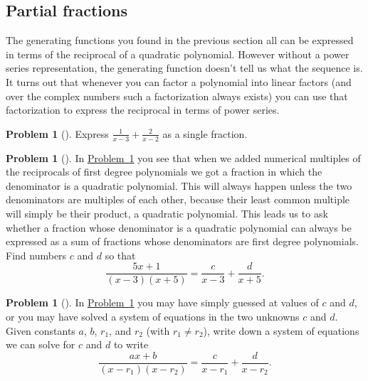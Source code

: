 \documentclass[10pt,]{book}
\theoremstyle{plain}
\theoremstyle{definition}
\newtheorem{activity}[project]{Problem}
\theoremstyle{definition}
\numberwithin{equation}{chapter}
\begin{document}
\subsection[{Partial fractions}]{Partial fractions}\label{subsection-49}
The generating functions you found in the previous section all can be expressed in terms of the reciprocal of a quadratic polynomial. However without a power series representation, the generating function doesn't tell us what the sequence is. It turns out that whenever you can factor a polynomial into linear factors (and over the complex numbers such a factorization always exists) you can use that factorization to express the reciprocal in terms of power series.%
\begin{activity}[] \label{simplifysumoffractions}
Express \(\frac{1}{x-3} + \frac{2}{x-2}\) as a single fraction.%
\end{activity}
\begin{activity}[] \label{partialfractionsintro}
In \hyperref[simplifysumoffractions]{Problem~\ref{simplifysumoffractions}} you see that when we added numerical multiples of the reciprocals of first degree polynomials we got a fraction in which the denominator is a quadratic polynomial. This will always happen unless the two denominators are multiples of each other, because their least common multiple will simply be their product, a quadratic polynomial. This leads us to ask whether a fraction whose denominator is a quadratic polynomial can always be expressed as a sum of fractions whose denominators are first degree polynomials. Find numbers \(c\) and \(d\) so that%
\begin{equation*}
\frac{5x+1}{(x-3)(x+5)} = \frac{c}{x-3} + \frac{d}{x+5}.
\end{equation*}
%
\end{activity}
\begin{activity}[] \label{partialfractions1}
In \hyperref[partialfractionsintro]{Problem~\ref{partialfractionsintro}} you may have simply guessed at values of \(c\) and \(d\), or you may have solved a system of equations in the two unknowns \(c\) and \(d\). Given constants \(a\), \(b\), \(r_1\), and \(r_2\) (with \(r_1\not= r_2\)), write down a system of equations we can solve for \(c\) and \(d\) to write%
\begin{equation*}
\frac{ax+b}{(x-r_1)(x-r_2)} = \frac{c}{x-r_1} + \frac{d}{x-r_2}\text{.}
\end{equation*}
%
\end{activity}
\end{document}
